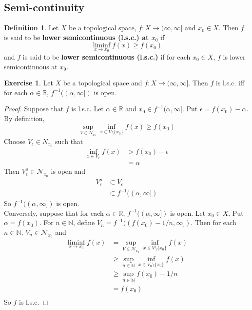 \documentclass[12pt]{amsart}
\theoremstyle{definition}
\newtheorem{defn}[definition]{Definition}
\theoremstyle{remark}
\theoremstyle{definition}
\newtheorem{ex}[definition]{Exercise}
\newcommand{\al}{\alpha}
\newcommand{\ep}{\epsilon}
\newcommand{\N}{\mathbb{N}}
\newcommand{\R}{\mathbb{R}}
\newcommand{\MN}{\mathcal{N}}
\newcommand{\Ru}{(\infty, \infty]}
\newcommand{\lsc}{l.s.c. }
\begin{document}
	
	
	\subsection{Semi-continuity}
	
	\begin{defn}
	Let $X$ be a topological space, $f: X \rightarrow \Ru$ and $x_0 \in X$. Then $f$ is said to be \textbf{lower semicontinuous (l.s.c.) at $x_0$} if $$\liminf_{x \rightarrow x_0}f(x) \geq f(x_0)$$ and $f$ is said to be \textbf{lower semicontinuous (l.s.c.)} if for each $x_0 \in X$, $f$ is lower semicontinuous at $x_0$. 
	\end{defn}
	
	\begin{ex}
	Let $X$ be a topological space and $f: X \rightarrow \Ru$. Then $f$ is \lsc iff for each $\al \in \R$, $f^{-1}((\al, \infty])$ is open. 
	\end{ex}
	
	\begin{proof}
	Suppose that $f$ is \lsc Let $\al \in \R$ and $x_0 \in f^{-1}(\al, \infty]$. Put $\ep = f(x_0) - \al$. By definition, $$\sup_{V \in N_{x_0}} \inf_{x \in V \setminus \{x_0\}} f(x) \geq f(x_0)$$ Choose $V_{\ep} \in N_{x_0}$ such that 
	\begin{align*}
	\inf_{x \in V_{\ep}} f(x)  
	&> f(x_0) - \ep \\
	&= \al
\end{align*}
Then $V_{\ep}^o \in \MN_{x_0}$ is open and 
	\begin{align*}
		V_{\ep}^o 
		& \subset V_{\ep} \\
		&\subset f^{-1}((\al, \infty])
	\end{align*} 
	So $f^{-1}((\al, \infty])$ is open. \\
	Conversely, suppose that for each $\al \in \R$, $f^{-1}((\al, \infty])$ is open. Let $x_0 \in X$. Put $\al = f(x_0)$. For $n \in \N$, define $V_n = f^{-1}((f(x_0)-1/n, \infty]) $. Then for each $n \in \N$, $V_n \in \MN_{x_0}$ and 
	\begin{align*}
	\liminf_{x \rightarrow x_0} f(x) 
	&= \sup_{V \in \MN_{x_0}} \inf_{x \in V \setminus \{x_0\}} f(x) \\
	& \geq \sup_{n \in \N} \inf_{x \in V_n \setminus \{x_0\}} f(x) \\
	& \geq \sup_{n \in \N} f(x_0)-1/n \\
	&= f(x_0) \\
	\end{align*}
	So $f$ is \lsc
	\end{proof}
	
\end{document}
